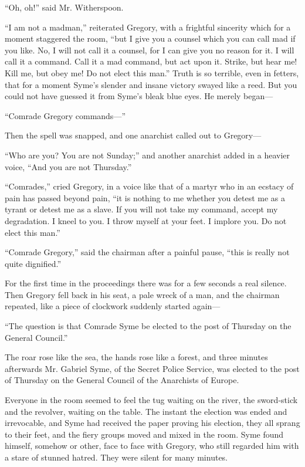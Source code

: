 “Oh, oh!” said Mr. Witherspoon.

“I am not a madman,” reiterated Gregory, with a frightful sincerity which for a moment staggered the room, “but I give you a counsel which you can call mad if you like. No, I will not call it a counsel, for I can give you no reason for it. I will call it a command. Call it a mad command, but act upon it. Strike, but hear me! Kill me, but obey me! Do not elect this man.” Truth is so terrible, even in fetters, that for a moment Syme’s slender and insane victory swayed like a reed. But you could not have guessed it from Syme’s bleak blue eyes. He merely began⁠—

“Comrade Gregory commands⁠—”

Then the spell was snapped, and one anarchist called out to Gregory⁠—

“Who are you? You are not Sunday;” and another anarchist added in a heavier voice, “And you are not Thursday.”

“Comrades,” cried Gregory, in a voice like that of a martyr who in an ecstacy of pain has passed beyond pain, “it is nothing to me whether you detest me as a tyrant or detest me as a slave. If you will not take my command, accept my degradation. I kneel to you. I throw myself at your feet. I implore you. Do not elect this man.”

“Comrade Gregory,” said the chairman after a painful pause, “this is really not quite dignified.”

For the first time in the proceedings there was for a few seconds a real silence. Then Gregory fell back in his seat, a pale wreck of a man, and the chairman repeated, like a piece of clockwork suddenly started again⁠—

“The question is that Comrade Syme be elected to the post of Thursday on the General Council.”

The roar rose like the sea, the hands rose like a forest, and three minutes afterwards Mr. Gabriel Syme, of the Secret Police Service, was elected to the post of Thursday on the General Council of the Anarchists of Europe.

Everyone in the room seemed to feel the tug waiting on the river, the sword-stick and the revolver, waiting on the table. The instant the election was ended and irrevocable, and Syme had received the paper proving his election, they all sprang to their feet, and the fiery groups moved and mixed in the room. Syme found himself, somehow or other, face to face with Gregory, who still regarded him with a stare of stunned hatred. They were silent for many minutes.

